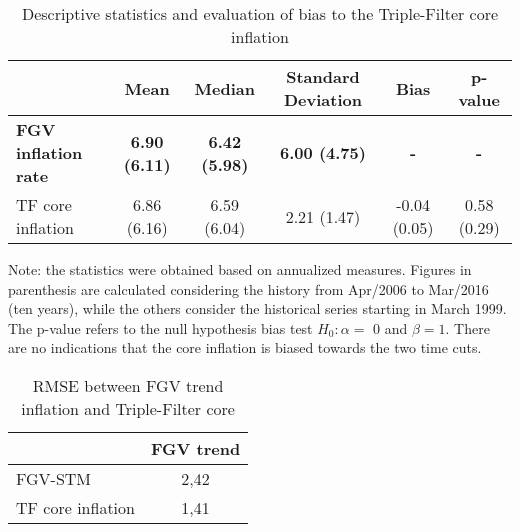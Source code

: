 \documentclass[10pt]{article}
\begin{document}
\begin{table}[]
\centering
\caption{Descriptive statistics and evaluation of bias to the Triple-Filter core inflation}\label{descritiva_ipc_nucleos}
\begin{threeparttable}
\begin{tabular}{@{}l|ccccc@{}}
\toprule
\textbf{}                       & \textbf{Mean}         & \textbf{Median}      & \textbf{Standard Deviation} & \textbf{Bias}  & \textbf{p-value}\\ \midrule
\textbf{FGV inflation rate}     & \textbf{6.90 (6.11)}  & \textbf{6.42 (5.98)} & \textbf{6.00 (4.75)}        & \textbf{-}     & \textbf{-}  \\ 
TF core inflation               & 6.86 (6.16)           & 6.59 (6.04)          & 2.21 (1.47)                 & -0.04 (0.05)   & 0.58 (0.29) \\ \bottomrule
\end{tabular}
\begin{tablenotes}
\item \scriptsize{Note: the statistics were obtained based on annualized measures. Figures in parenthesis are calculated considering the history from Apr/2006 to Mar/2016 (ten years), while the others consider the historical series starting in March 1999. The p-value refers to the null hypothesis bias test $H_0: \alpha = $ 0 and $\beta = 1$. There are no indications that the core inflation is biased towards the two time cuts.}

\end{tablenotes}
\end{threeparttable}
\end{table}


\vspace{0.3cm}

\begin{table}[]
\centering
\caption{RMSE between FGV trend inflation and Triple-Filter core}\label{rmse_ipc_nucleos}
\begin{threeparttable}
\begin{tabular}{p{3cm}|c}
\toprule
                   & \textbf{FGV trend} \\ \midrule
FGV-STM            & 2,42      \\
TF core inflation  & 1,41      \\  \bottomrule
\end{tabular}
\end{threeparttable}
\end{table}
\end{document}
